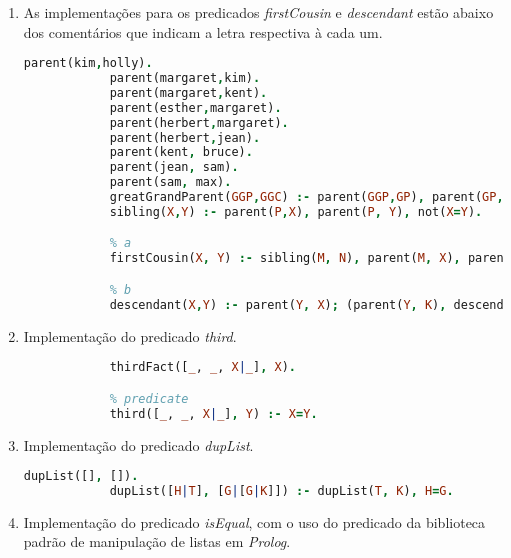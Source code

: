 \documentclass{article}
\begin{document}
\begin{enumerate}
    \item

          As implementações para os predicados \textit{firstCousin} e
          \textit{descendant} estão abaixo dos comentários
          que indicam a letra respectiva à cada um.

          \begin{lstlisting}[language=Prolog]
            parent(kim,holly).
            parent(margaret,kim).
            parent(margaret,kent).
            parent(esther,margaret).
            parent(herbert,margaret).
            parent(herbert,jean).
            parent(kent, bruce).
            parent(jean, sam).
            parent(sam, max).
            greatGrandParent(GGP,GGC) :- parent(GGP,GP), parent(GP,P), parent(P,GGC).
            sibling(X,Y) :- parent(P,X), parent(P, Y), not(X=Y).

            % a
            firstCousin(X, Y) :- sibling(M, N), parent(M, X), parent(N, Y), not(X=Y), not(sibling(X, Y)).

            % b
            descendant(X,Y) :- parent(Y, X); (parent(Y, K), descendant(X, K)).
        \end{lstlisting}

    \item

          Implementação do predicado \textit{third}.

          \begin{lstlisting}[language=Prolog]
            % fact
            thirdFact([_, _, X|_], X).

            % predicate
            third([_, _, X|_], Y) :- X=Y.
        \end{lstlisting}

    \item

          Implementação do predicado \textit{dupList}.

          \begin{lstlisting}[language=Prolog]
            dupList([], []).
            dupList([H|T], [G|[G|K]]) :- dupList(T, K), H=G.
        \end{lstlisting}

    \item

          Implementação do predicado \textit{isEqual}, com o uso do predicado
          da
          biblioteca padrão de manipulação
          de listas em \textit{Prolog}.


\end{enumerate}
\end{document}
